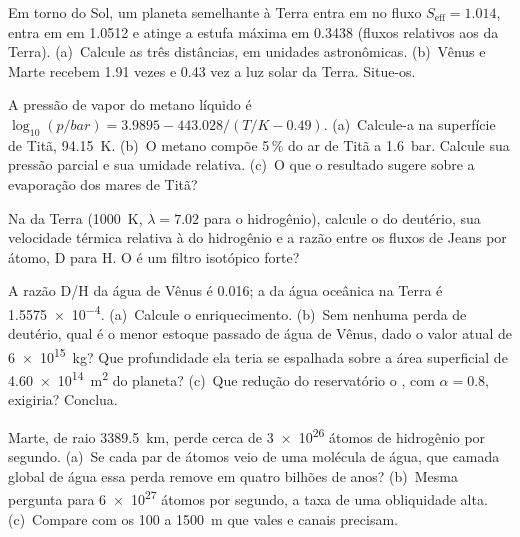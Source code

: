 \begin{exercise}[$\star$]\label{exo:b3:planetary-atmospheres:3}
Em torno do Sol, um planeta semelhante à Terra entra em  no fluxo $S_\mathrm{eff}
= 1.014$, entra em  em 1.0512 e atinge a estufa máxima em 0.3438
(fluxos relativos aos da Terra). (a)~Calcule as três distâncias, em
unidades astronômicas. (b)~Vênus e Marte recebem 1.91 vezes e 0.43 vez a luz solar da
Terra. Situe-os.
\end{exercise}

\begin{exercise}[$\star$]\label{exo:b3:planetary-atmospheres:4}
A pressão de vapor do metano líquido é $\log_{10}(p/\unit{bar}) = 3.9895 -
443.028/(T/\unit{K} - 0.49)$. (a)~Calcule-a na superfície de Titã,
\qty{94.15}{K}. (b)~O metano compõe 5\,\% do ar de Titã a \qty{1.6}{bar}.
Calcule sua pressão parcial e sua umidade relativa. (c)~O que o
resultado sugere sobre a evaporação dos mares de Titã?
\end{exercise}

\begin{exercise}[$\star\star$]\label{exo:b3:planetary-atmospheres:5}
Na  da Terra (\qty{1000}{K}, $\lambda = 7.02$ para o hidrogênio),
calcule o  do deutério, sua velocidade térmica relativa à
do hidrogênio e a razão entre os fluxos de Jeans por átomo, D para H. O  é
um filtro isotópico forte?
\end{exercise}

\begin{exercise}[$\star\star$]\label{exo:b3:planetary-atmospheres:6}
A razão D/H da água de Vênus é \num{0.016}; a da água oceânica na
Terra é \num{1.5575e-4}. (a)~Calcule o enriquecimento. (b)~Sem nenhuma
perda de deutério, qual é o menor estoque passado de água
de Vênus, dado o valor atual de \qty{6e15}{kg}? Que profundidade ela teria se espalhada sobre
a área superficial de \qty{4.60e14}{m^2} do planeta? (c)~Que redução do reservatório
o , com $\alpha = 0.8$, exigiria? Conclua.
\end{exercise}

\begin{exercise}[$\star\star$]\label{exo:b3:planetary-atmospheres:7}
Marte, de raio \qty{3389.5}{km}, perde cerca de \num{3e26} átomos de hidrogênio
por segundo. (a)~Se cada par de átomos veio de uma molécula de água, que
camada global de água essa perda remove em quatro bilhões de anos?
(b)~Mesma pergunta para \num{6e27} átomos por segundo, a taxa de uma
obliquidade alta. (c)~Compare com os 100 a \qty{1500}{m} que vales e
canais precisam.
\end{exercise}

